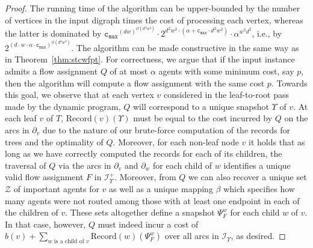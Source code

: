\documentclass[letterpaper]{article} %
\newcommand{\bigoh}{\ensuremath{{\mathcal O}}}
\newcommand{\cmax}{\mathtt{c_{max}}}
\newcommand{\Rec}{\text{Record}}
\newcommand{\Imp}{\mathcal{Z}}
\begin{document}
\begin{proof}
\vspace{-3.05mm}
The running time of the algorithm can be upper-bounded by the number of vertices in the input digraph times the cost of processing each vertex, whereas the latter is dominated by $\cmax^{(dw)^{\bigoh(d^4w^4)}}\cdot 2^{d^2w^2\cdot (\alpha+\cmax\cdot d^2w^2)} \cdot \alpha^{w^2d^2}$, i.e., by $2^{(d\cdot w\cdot \alpha\cdot \cmax)^{\bigoh(d^4w^4)}}$. The algorithm can be made constructive in the same way as in Theorem~\ref{thm:stcwfpt}. For correctness, we argue that if the input instance admits a flow assignment $Q$ of at most $\alpha$ agents with some minimum cost, say $p$, then the algorithm will compute a flow assignment with the same cost $p$. Towards this goal, we observe that at each vertex $v$ considered in the leaf-to-root pass made by the dynamic program, $Q$ will correspond to a unique snapshot $\Upsilon$ of $v$. At each leaf $v$ of $T$, $\Rec(v)(\Upsilon)$ must be equal to the cost incurred by $Q$ on the arcs in $\partial_v$ due to the nature of our brute-force computation of the records for trees and the optimality of $Q$. Moreover, for each non-leaf node $v$ it holds that as long as we have correctly computed the records for each of its children, the traversal of $Q$ via the arcs in $\partial_v$ and $\partial_w$ for each child of $w$ identifies a unique valid flow assignment $F$ in $\mathcal{I}^+_\Upsilon$. Moreover, from $Q$ we can also recover a unique set $\Imp$ of important agents for $v$ as well as a unique mapping $\beta$ which specifies how many agents were not routed among those with at least one endpoint in each of the children of $v$. These sets altogether define a snapshot $\Psi^w_F$ for each child $w$ of $v$. In that case, however, $Q$ must indeed incur a cost of $b(v)+\sum_{w\text{ is a child of }v}\Rec(w)(\Psi^w_F)$ over all arcs in $\mathcal{I}_\Upsilon$, as desired.
\end{proof}
\end{document}
